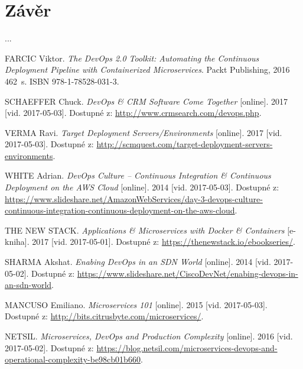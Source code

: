 \documentclass[FM,DP]{tulthesis}
\begin{document}
\chapter{Závěr}

...

\appendix
\begin{thebibliography}{Mm99} 


FARCIC Viktor. 
\emph{The DevOps 2.0 Toolkit: Automating the Continuous Deployment Pipeline with Containerized Microservices}. 
Packt Publishing, 2016 462~s. ISBN 978-1-78528-031-3.

SCHAEFFER Chuck. 
\emph{DevOps \& CRM Software Come Together} [online]. 
2017 [vid. 2017-05-03]. Dostupné z: 
\url{http://www.crmsearch.com/devops.php}.

VERMA Ravi. 
\emph{Target Deployment Servers/Environments} [online]. 
2017 [vid. 2017-05-03]. Dostupné z: 
\url{http://scmquest.com/target-deployment-servers-environments}.

WHITE Adrian. 
\emph{DevOps Culture -- Continuous Integration \& Continuous Deployment on the AWS Cloud} [online]. 
2014 [vid. 2017-05-03]. Dostupné z: 
\url{https://www.slideshare.net/AmazonWebServices/day-3-devops-culture-continuous-integration-continuous-deployment-on-the-aws-cloud}.


THE NEW STACK. 
\emph{Applications \& Microservices with Docker \& Containers} [e-kniha]. 
2017 [vid. 2017-05-01]. Dostupné z: \url{https://thenewstack.io/ebookseries/}.

SHARMA Akshat. 
\emph{Enabing DevOps in an SDN World} [online]. 
2014 [vid. 2017-05-02]. Dostupné z: 
\url{https://www.slideshare.net/CiscoDevNet/enabing-devops-in-an-sdn-world}.

MANCUSO Emiliano. 
\emph{Microservices 101} [online]. 
2015 [vid. 2017-05-03]. Dostupné z: 
\url{http://bits.citrusbyte.com/microservices/}.

NETSIL. 
\emph{Microservices, DevOps and Production Complexity} [online]. 
2016 [vid. 2017-05-02]. Dostupné z: 
\url{https://blog.netsil.com/microservices-devops-and-operational-complexity-be98cb01b660}.



\end{thebibliography}
\end{document}
